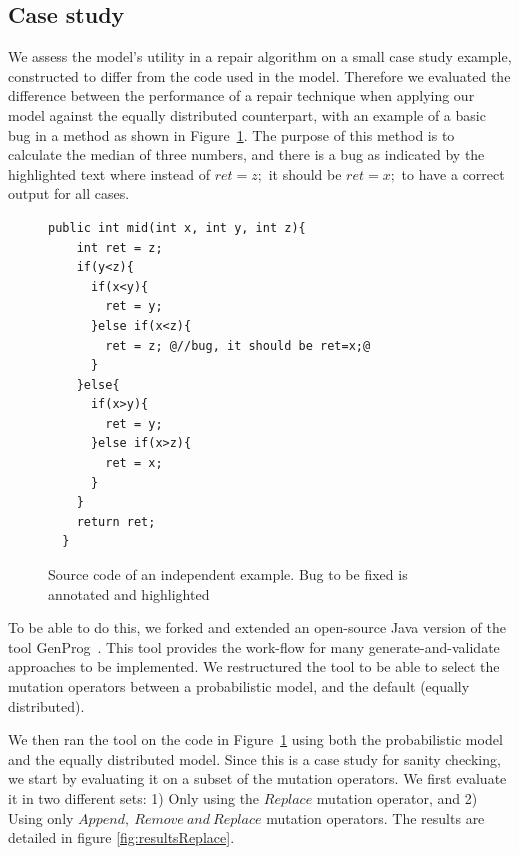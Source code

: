 \documentclass[conference]{IEEEtran}
\begin{document}
\subsection{Case study}
\label{sec:casestudy}

We assess the
model's utility in a repair algorithm on a small case study example, constructed
to differ from the code used in the model.  Therefore we evaluated the difference between the performance of a repair technique when applying our model
against the equally distributed counterpart, with an example of a basic bug in a method as shown in Figure~\ref{fig:initialExample}. The purpose of this method is to calculate the median 
of three numbers, and there is a bug as indicated by the highlighted text where 
instead of $ret = z;$ it should be $ret = x;$ to have a correct output 
for all cases.



\begin{figure}[t]
\begin{lstlisting}[frame=single,style=base]
  public int mid(int x, int y, int z){
    int ret = z;  
    if(y<z){
      if(x<y){
        ret = y;
      }else if(x<z){
        ret = z; @//bug, it should be ret=x;@
      }
    }else{
      if(x>y){
        ret = y;
      }else if(x>z){
        ret = x;
      }
    }
    return ret;
  }	
	\end{lstlisting}
	\caption{Source code of an independent example. Bug to be fixed is annotated and highlighted}
	\label{fig:initialExample}
\end{figure}




To be able to do this, we forked and extended an open-source Java version of the 
tool GenProg~\cite{legoues2012}. This tool provides the work-flow 
for many generate-and-validate approaches to be implemented. We restructured the 
tool to be able to select the mutation operators between a 
probabilistic model, and the default (equally distributed).

We then ran the tool on the code in Figure~\ref{fig:initialExample} using both 
the probabilistic model and the equally distributed model. Since this is a 
case study for sanity checking, we start by evaluating it on a subset of 
the mutation operators. We first evaluate it in two different sets: 1) Only using the $Replace$ mutation operator, and 2) Using only $Append,~
Remove~and~Replace$ mutation operators. The results are detailed in figure 
\ref{fig:resultsReplace}. 
\end{document}
